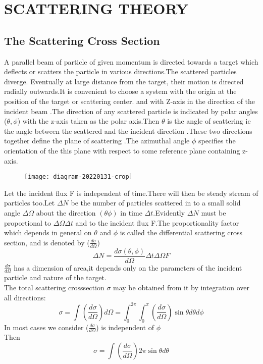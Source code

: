 \chapter{SCATTERING THEORY}
\section{The Scattering Cross Section}
A parallel beam of particle of given momentum is directed towards a target which deflects or scatters the particle in various directions.The scattered particles diverge. Eventually at large distance from the target, their motion is directed radially outwards.It is convenient to choose a system with the origin at the position of the target or scattering center. and with Z-axis in the direction of the incident beam .The direction of any scattered particle is indicated by polar angles ($\theta, \phi$) with the z-axis taken as the polar axis.Then $\theta$ is the angle of scattering ie the angle between the scattered and the incident direction .These two directions together define the plane of scattering .The azimuthal angle $\phi$ specifies the orientation of the this plane with respect to some reference plane containing z-axis.\\
\begin{figure}[H]
	\centering
	\texttt{[image: diagram-20220131-crop]}
	\caption{}
	\label{}
\end{figure}
\par Let the incident flux F is independent of time.There will then be steady stream of particles too.Let $\Delta N$ be the number of particles scattered in to a small solid angle $\Delta \Omega$ about the direction $(\theta \phi)$ in time $\Delta t$.Evidently 
$\Delta N$ must be proportional to $\Delta \Omega \Delta t$ and to the incident flux F.The proportionality factor which depends in general on $\theta$ and $\phi$ is called the differential scattering cross section, and is denoted by ($\frac{d\sigma}{d\Omega}$)\\
$$ \Delta N=\frac{d\sigma(\theta,\phi)}{d\Omega}\Delta t \Delta \Omega F$$
$\frac{d\sigma}{d\Omega}$ has a dimension of area,it depends only on the parameters of the incident particle and nature of the target.\\
The total scattering crosssection $\sigma$ may be obtained from it by integration over all directions:\\
$$\sigma=\int (\frac{d\sigma}{d\Omega})d\Omega=\int_{0}^{2\pi}\int_{0}^{\pi}(\frac{d\sigma}{d\Omega})\sin \theta d\theta d\phi$$
In most cases we consider ($\frac{d\sigma}{d\Omega}$) is independent of $\phi$\\
Then $$\sigma=\int (\frac{d\sigma}{d\Omega}) 2\pi \sin \theta d \theta$$
